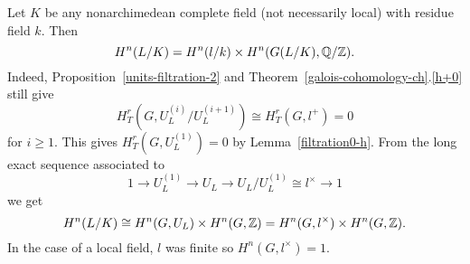 \begin{rem}
Let $K$ be any nonarchimedean complete field (not necessarily local) with residue field $k$. Then %
\[
H^n(L/K)=H^n(l/k)\times H^n(G(L/K),\mathbb{Q}/\mathbb{Z}).
\]
Indeed, Proposition~\ref{units-filtration-2} and Theorem~\ref{galois-cohomology-ch}.\ref{h+0} still give
\[
H_T^r(G,U_L^{(i)}/U_L^{(i+1)})\cong H_T^r(G,l^{+})=0
\]
for $i\ge 1$. This gives $H_T^r(G,U_L^{(1)})=0$ by Lemma~\ref{filtration0-h}. 
From the long exact sequence associated to
\[
1\to U_L^{(1)}\to U_L\to U_L/U_L^{(1)}\cong l^{\times}\to 1
\]
we get
\[
H^n(L/K)\cong H^n(G,U_L)\times H^n(G,\mathbb{Z})=H^n(G,l^{\times})\times H^n(G,\mathbb{Z}).
\]
In the case of a local field, $l$ was finite so $H^n(G,l^{\times})=1$.
\end{rem}
%

